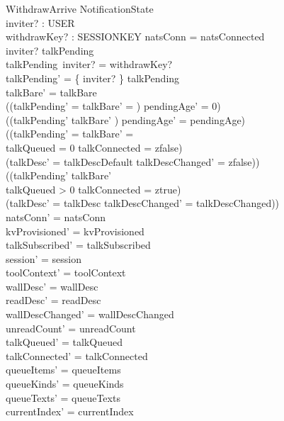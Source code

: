 \documentclass[a4paper,10pt,fleqn]{article}
\begin{document}
\begin{schema}{WithdrawArrive}
  \Delta NotificationState \\
  inviter? : USER \\
  withdrawKey? : SESSIONKEY
  \where
  natsConn = natsConnected \\
  inviter? \in \dom talkPending \\
  talkPending~inviter? = withdrawKey? \\
  talkPending' = \{ inviter? \} \ndres talkPending \\
  talkBare' = talkBare \\
  ((\dom talkPending' = \emptyset \land talkBare' = \emptyset) \implies
  pendingAge' = 0) \\
  ((\dom talkPending' \neq \emptyset \lor talkBare' \neq \emptyset) \implies
  pendingAge' = pendingAge) \\
  ((\dom talkPending' = \emptyset \land talkBare' = \emptyset \land \\
  \quad talkQueued = 0 \land talkConnected = zfalse) \implies \\
  \quad (talkDesc' = talkDescDefault \land talkDescChanged' = zfalse)) \\
  ((\dom talkPending' \neq \emptyset \lor talkBare' \neq \emptyset \lor \\
  \quad talkQueued > 0 \lor talkConnected = ztrue) \implies \\
  \quad (talkDesc' = talkDesc \land talkDescChanged' = talkDescChanged)) \\
  natsConn' = natsConn \\
  kvProvisioned' = kvProvisioned \\
  talkSubscribed' = talkSubscribed \\
  session' = session \\
  toolContext' = toolContext \\
  wallDesc' = wallDesc \\
  readDesc' = readDesc \\
  wallDescChanged' = wallDescChanged \\
  unreadCount' = unreadCount \\
  talkQueued' = talkQueued \\
  talkConnected' = talkConnected \\
  queueItems' = queueItems \\
  queueKinds' = queueKinds \\
  queueTexts' = queueTexts \\
  currentIndex' = currentIndex \\

\end{schema}
\end{document}
